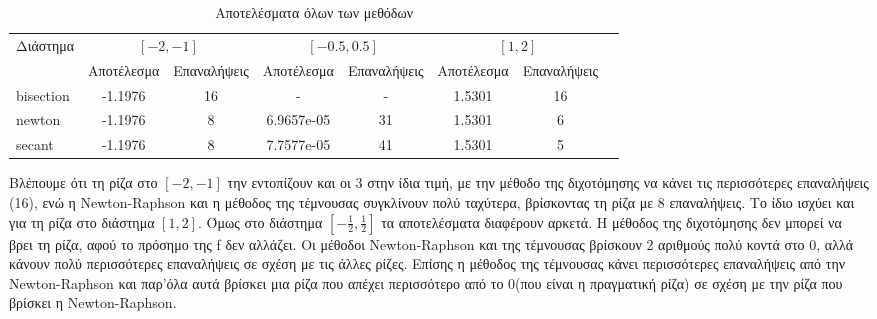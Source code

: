 \documentclass[12pt,a4paper]{article}
\begin{document}
    \begin{table}[hb]
        \centering
        \footnotesize
        \setlength\tabcolsep{1.5pt}
        \begin{tabular}{|l|c|c|c|c|c|c|l}
        \cline{1-7}
        Διάστημα  & \multicolumn{2}{c|}{$[-2,-1]$}                                     & \multicolumn{2}{c|}{$[-0.5,0.5]$}                                  & \multicolumn{2}{c|}{$[1,2]$}                                       &  \\ \cline{1-7}
                  & \multicolumn{1}{l|}{Αποτέλεσμα} & \multicolumn{1}{l|}{Επαναλήψεις} & \multicolumn{1}{l|}{Αποτέλεσμα} & \multicolumn{1}{l|}{Επαναλήψεις} & \multicolumn{1}{l|}{Αποτέλεσμα} & \multicolumn{1}{l|}{Επαναλήψεις} &  \\ \cline{1-7}
        bisection & -1.1976                         & 16                               & -                               & -                                & 1.5301                          & 16                               &  \\ \cline{1-7}
        newton    & -1.1976                         & 8                                & 6.9657e-05                      & 31                               & 1.5301                          & 6                                &  \\ \cline{1-7}
        secant    & -1.1976                         & 8                                & 7.7577e-05                      & 41                               & 1.5301                          & 5                                &  \\ \cline{1-7}
        \end{tabular}
        \caption{Αποτελέσματα όλων των μεθόδων}
        \label{tab:root-results}
    \end{table}

    Βλέπουμε ότι τη ρίζα στο $[-2,-1]$ την εντοπίζουν και οι 3 στην ίδια τιμή, με την μέθοδο της διχοτόμησης να κάνει τις περισσότερες επαναλήψεις (16), ενώ 
    η Newton-Raphson και η μέθοδος της τέμνουσας συγκλίνουν πολύ ταχύτερα, βρίσκοντας τη ρίζα με 8 επαναλήψεις. Το ίδιο ισχύει και για τη ρίζα 
    στο διάστημα $[1,2]$. Όμως στο διάστημα $[-\frac{1}{2},\frac{1}{2}]$ τα αποτελέσματα διαφέρουν αρκετά. Η μέθοδος της διχοτόμησης δεν μπορεί να βρει τη ρίζα, 
    αφού το πρόσημο της f δεν αλλάζει. Οι μέθοδοι Newton-Raphson και της τέμνουσας βρίσκουν 2 αριθμούς πολύ κοντά στο 0, αλλά κάνουν 
    πολύ περισσότερες επαναλήψεις σε σχέση με τις άλλες ρίζες. Επίσης η μέθοδος της τέμνουσας κάνει περισσότερες επαναλήψεις από την Newton-Raphson και 
    παρ'όλα αυτά βρίσκει μια ρίζα που απέχει περισσότερο από το 0(που είναι η πραγματική ρίζα) σε σχέση με την ρίζα που βρίσκει η Newton-Raphson.
\end{document}
